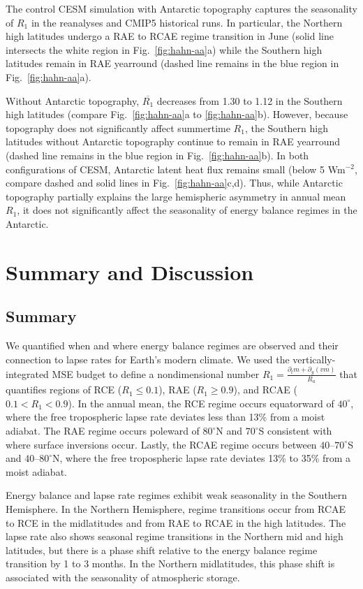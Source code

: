\documentclass{ametsocV5}
\begin{document}
  The control CESM simulation with Antarctic topography captures the seasonality of $R_1$ in the reanalyses and CMIP5 historical runs. In particular, the Northern high latitudes undergo a RAE to RCAE regime transition in June (solid line intersects the white region in Fig.~\ref{fig:hahn-aa}a) while the Southern high latitudes remain in RAE yearround (dashed line remains in the blue region in Fig.~\ref{fig:hahn-aa}a).

  Without Antarctic topography, $\overline{R_1}$ decreases from 1.30 to 1.12 in the Southern high latitudes (compare Fig.~\ref{fig:hahn-aa}a to \ref{fig:hahn-aa}b). However, because topography does not significantly affect summertime $R_1$, the Southern high latitudes without Antarctic topography continue to remain in RAE yearround (dashed line remains in the blue region in Fig.~\ref{fig:hahn-aa}b). In both configurations of CESM, Antarctic latent heat flux remains small (below 5 Wm$^{-2}$, compare dashed and solid lines in Fig.~\ref{fig:hahn-aa}c,d). Thus, while Antarctic topography partially explains the large hemispheric asymmetry in annual mean $R_1$, it does not significantly affect the seasonality of energy balance regimes in the Antarctic.

\section{Summary and Discussion}\label{sec:conclusion}
\subsection{Summary}
We quantified when and where energy balance regimes are observed and their connection to lapse rates for Earth's modern climate. We used the vertically-integrated MSE budget to define a nondimensional number $R_1=\frac{\partial_t m + \partial_y (vm)}{R_a}$ that quantifies regions of RCE ($R_1\le0.1$), RAE ($R_1\ge0.9$), and RCAE ($0.1<R_1<0.9$). In the annual mean, the RCE regime occurs equatorward of $40^\circ$, where the free tropospheric lapse rate deviates less than 13\% from a moist adiabat. The RAE regime occurs poleward of $80^\circ$N and $70^\circ$S consistent with where surface inversions occur. Lastly, the RCAE regime occurs between $40$--$70^\circ$S and $40$--$80^\circ$N, where the free tropospheric lapse rate deviates 13\% to 35\% from a moist adiabat.

Energy balance and lapse rate regimes exhibit weak seasonality in the Southern Hemisphere. In the Northern Hemisphere, regime transitions occur from RCAE to RCE in the midlatitudes and from RAE to RCAE in the high latitudes. The lapse rate also shows seasonal regime transitions in the Northern mid and high latitudes, but there is a phase shift relative to the energy balance regime transition by 1 to 3 months. In the Northern midlatitudes, this phase shift is associated with the seasonality of atmospheric storage.
\end{document}

